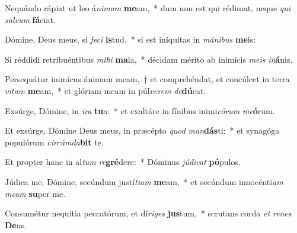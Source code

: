 \item Nequándo rápiat ut leo á\textit{ni}\textit{mam} \textbf{me}am,~* dum non est qui rédimat, neque \textit{qui} \textit{sal}\textit{vum} \textbf{fá}ciat.
\item Dómine, Deus meus, si \textit{fe}\textit{ci} \textbf{is}tud.~* si est iníquitas in \textit{má}\textit{ni}\textit{bus} \textbf{me}is:
\item Si réddidi retribuéntibus \textit{mi}\textit{hi} \textbf{ma}la,~* décidam mérito ab inimícis \textit{me}\textit{is} \textit{in}\textbf{á}nis.
\item Persequátur inimícus ánimam meam,~† et comprehéndat, et concúlcet in terra \textit{vi}\textit{tam} \textbf{me}am,~* et glóriam meam in púl\textit{ve}\textit{rem} \textit{de}\textbf{dú}cat.
\item Exsúrge, Dómine, in \textit{i}\textit{ra} \textbf{tu}a:~* et exaltáre in fínibus inimi\textit{có}\textit{rum} \textit{me}\textbf{ó}rum.
\item Et exsúrge, Dómine Deus meus, in præcépto \textit{quod} \textit{man}\textbf{dás}ti:~* et synagóga populórum \textit{cir}\textit{cúm}\textit{da}\textbf{bit} te.
\item Et propter hanc in al\textit{tum} \textit{re}\textbf{gré}dere:~* Dóminus \textit{jú}\textit{di}\textit{cat} \textbf{pó}pulos.
\item Júdica me, Dómine, secúndum justí\textit{ti}\textit{am} \textbf{me}am,~* et secúndum innocénti\textit{am} \textit{me}\textit{am} \textbf{su}per me.
\item Consumétur nequítia peccatórum, et dí\textit{ri}\textit{ges} \textbf{jus}tum,~* scrutans corda \textit{et} \textit{re}\textit{nes} \textbf{De}us.
